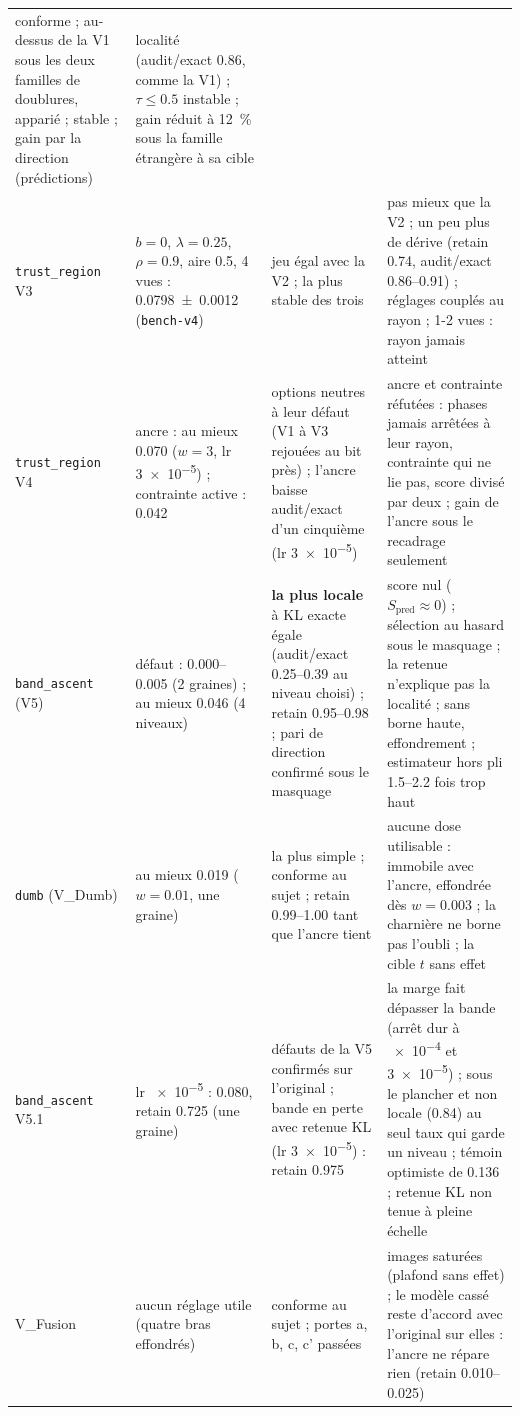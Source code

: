 \documentclass[11pt,a4paper]{article}
\newcommand{\code}[1]{\texttt{#1}}
\begin{document}
\begin{table}[ht]
\begin{tabularx}{\linewidth}{@{}>{\raggedright}p{2.3cm}>{\raggedright}p{3.4cm}>{\raggedright}X>{\raggedright\arraybackslash}X@{}}
      conforme ; au-dessus de la V1 sous les deux familles de doublures, apparié ; stable ; gain par
      la direction (prédictions) & localité (audit/exact \num{0.86}, comme la V1) ; $\tau\le\num{0.5}$
      instable ; gain réduit à \SI{12}{\percent} sous la famille étrangère à sa cible\\
    \code{trust\_region} V3 & $b=0$, $\lambda=\num{0.25}$, $\rho=\num{0.9}$, aire \num{0.5}, 4 vues :
      \num{0.0798 +- 0.0012} (\code{bench-v4}) & jeu égal avec la V2 ; la plus stable des trois &
      pas mieux que la V2 ; un peu plus de dérive (retain \num{0.74}, audit/exact
      \numrange{0.86}{0.91}) ; réglages couplés au rayon ; 1-2 vues : rayon jamais atteint\\
    \code{trust\_region} V4 & ancre : au mieux \num{0.070} ($w=3$, lr \num{3e-5}) ; contrainte active :
      \num{0.042} & options neutres à leur défaut (V1 à V3 rejouées au bit près) ; l'ancre baisse
      audit/exact d'un cinquième (lr \num{3e-5}) & ancre et contrainte réfutées : phases jamais
      arrêtées à leur rayon, contrainte qui ne lie pas, score divisé par deux ; gain de l'ancre
      sous le recadrage seulement\\
    \code{band\_ascent} (V5) & défaut : \numrange{0.000}{0.005} (2 graines) ; au mieux \num{0.046}
      (4 niveaux) & \textbf{la plus locale} à KL exacte égale (audit/exact \numrange{0.25}{0.39} au
      niveau choisi) ; retain \numrange{0.95}{0.98} ; pari de direction confirmé sous le masquage &
      score nul ($S_{\text{pred}}\approx0$) ; sélection au hasard sous le masquage ; la retenue
      n'explique pas la localité ; sans borne haute, effondrement ; estimateur hors pli
      \numrange{1.5}{2.2} fois trop haut\\
    \code{dumb} (V\_Dumb) & au mieux \num{0.019} ($w=\num{0.01}$, une graine) & la plus simple ;
      conforme au sujet ; retain \numrange{0.99}{1.00} tant que l'ancre tient & aucune dose
      utilisable : immobile avec l'ancre, effondrée dès $w=\num{0.003}$ ; la charnière ne borne pas
      l'oubli ; la cible $t$ sans effet\\
    \code{band\_ascent} V5.1 & lr \num{e-5} : \num{0.080}, retain \num{0.725} (une graine) &
      défauts de la V5 confirmés sur l'original ; bande en perte avec retenue KL (lr \num{3e-5}) :
      retain \num{0.975} & la marge fait dépasser la bande (arrêt dur à \num{e-4} et \num{3e-5}) ;
      sous le plancher et non locale (\num{0.84}) au seul taux qui garde un niveau ; témoin optimiste
      de \num{0.136} ; retenue KL non tenue à pleine échelle\\
    V\_Fusion & aucun réglage utile (quatre bras effondrés) & conforme au sujet ; portes a, b, c, c'
      passées & images saturées (plafond sans effet) ; le modèle cassé reste d'accord avec l'original
      sur elles : l'ancre ne répare rien (retain \numrange{0.010}{0.025})\\
    \bottomrule
  \end{tabularx}
\end{table}
\end{document}
